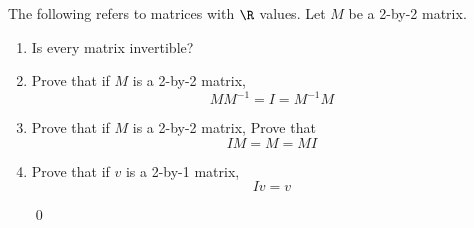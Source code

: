   The following refers to matrices with $\R$ values.
  Let $M$ be a 2-by-2 matrix.
  \begin{enumerate}[nosep]

    \item Is every matrix invertible?

    \item Prove that if $M$ is a 2-by-2 matrix,
    \[
    MM^{-1} = I = M^{-1}M
    \]

    \item Prove that if $M$ is a 2-by-2 matrix,
    Prove that
    \[
    IM = M = MI
    \]

    \item Prove that if $v$ is a 2-by-1 matrix,
    \[
    Iv = v
    \]

    \qed
  \end{enumerate}
